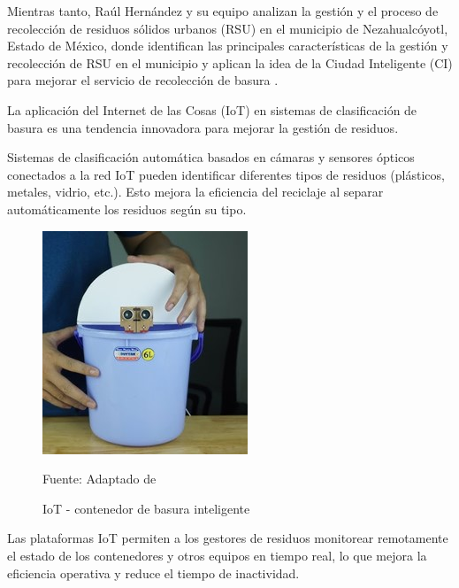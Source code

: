Mientras tanto, Raúl Hernández y su equipo analizan la gestión y el proceso de recolección de residuos sólidos urbanos (RSU) en el municipio de Nezahualcóyotl, Estado de México, donde identifican las principales características de la gestión y recolección de RSU en el municipio y aplican la idea de la Ciudad Inteligente (CI) para mejorar el servicio de recolección de basura \cite{sinaluisa}.

La aplicación del Internet de las Cosas (IoT) en sistemas de clasificación de basura es una tendencia innovadora para mejorar la gestión de residuos. 

Sistemas de clasificación automática basados en cámaras y sensores ópticos conectados a la red IoT pueden identificar diferentes tipos de residuos (plásticos, metales, vidrio, etc.). Esto mejora la eficiencia del reciclaje al separar automáticamente los residuos según su tipo.

\begin{figure}[htb]
	\centering
	\includegraphics[scale  = 0.90]{Imagenes/iot_contenedor.jpg}
	\caption{IoT - contenedor de basura inteligente}{Fuente: Adaptado de~\cite{logic}}

\end{figure}

Las plataformas IoT permiten a los gestores de residuos monitorear remotamente el estado de los contenedores y otros equipos en tiempo real, lo que mejora la eficiencia operativa y reduce el tiempo de inactividad.